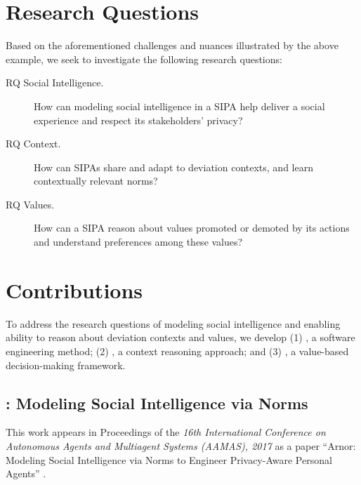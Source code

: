 \section{Research Questions}
\label{sec:intro-questions}

Based on the aforementioned challenges and nuances illustrated by the above example, we seek 
to investigate the following research questions: 

\begin{description}

\item[RQ Social Intelligence.] How can modeling social intelligence in a SIPA help deliver a social experience and respect its stakeholders' privacy?

\item[RQ Context.] How can SIPAs share and adapt to deviation contexts, and learn contextually relevant norms? 

\item[RQ Values.] How can a SIPA reason about values promoted or demoted by its actions and understand preferences among these values?

\end{description}

\section{Contributions}
\label{sec:intro-contributions}

To address the research questions of modeling social intelligence and
enabling ability to reason about deviation contexts and values, we
develop (1) \frameworkA, a software engineering method; (2) \frameworkB, a context
reasoning approach; and (3) \frameworkAinur, a value-based decision-making framework.

\subsection[Modeling Social Intelligence via Norms]{\frameworkA: Modeling Social Intelligence via Norms}

This work appears in Proceedings of the \emph{16th International Conference on Autonomous Agents and Multiagent Systems (AAMAS), 2017} as a paper ``Arnor: Modeling Social Intelligence via Norms to Engineer Privacy-Aware Personal Agents'' \citep{Ajmeri-AAMAS17-Arnor}.

